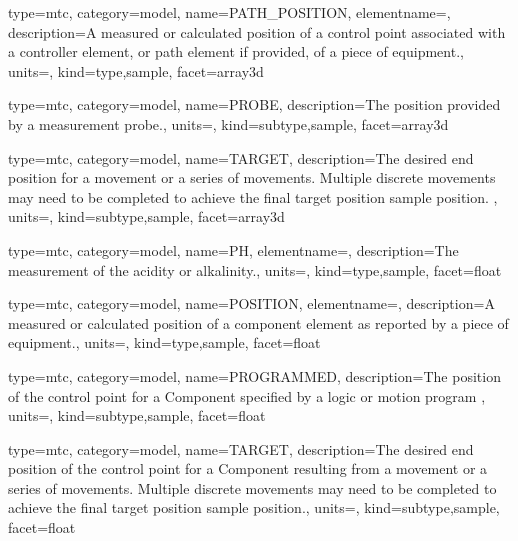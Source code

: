 {
  type=mtc,
  category=model,
  name={PATH\_POSITION},
  elementname=,
  description={A measured or calculated position of a control point associated with a \gls{controller} element, or \gls{path} element if provided, of a piece of equipment.},
  units=,
  kind={type,sample},
  facet={\gls{array3d}}
}


{
  type=mtc,
  category=model,
  name={PROBE},
  description={The position provided by a measurement probe.},
  units=,
  kind={subtype,sample},
  facet={\gls{array3d}}
}


{
  type=mtc,
  category=model,
  name={TARGET},
  description={The desired end position for a movement or a series of movements. Multiple discrete movements may need to be completed to achieve the final \gls{target position sample} position.  },
  units=,
  kind={subtype,sample},
  facet={\gls{array3d}}
}


{
  type=mtc,
  category=model,
  name={PH},
  elementname=,
  description={The measurement of the acidity or alkalinity.},
  units=,
  kind={type,sample},
  facet={\gls{float}}
}


{
  type=mtc,
  category=model,
  name={POSITION},
  elementname=,
  description={A measured or calculated position of a \gls{component} element as reported by a piece of equipment.},
  units=,
  kind={type,sample},
  facet={\gls{float}}
}



{
  type=mtc,
  category=model,
  name={PROGRAMMED},
  description={The position of the control point for a Component specified by a logic or motion program },
  units=,
  kind={subtype,sample},
  facet={\gls{float}}
}


{
  type=mtc,
  category=model,
  name={TARGET},
  description={The desired end position of the control point for a Component resulting from a movement or a series of movements.  Multiple discrete movements may need to be completed to achieve the final \gls{target position sample} position.},
  units=,
  kind={subtype,sample},
  facet={\gls{float}}
}


